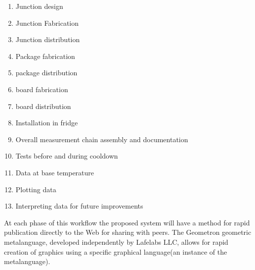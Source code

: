 \documentclass[11pt]{article}
\begin{document}
    \begin{enumerate}

        \item
Junction design
        \item
Junction Fabrication
        \item
Junction distribution
        \item
Package fabrication
        \item
package distribution
        \item
board fabrication
        \item
board distribution
        \item
Installation in fridge
        \item
Overall measurement chain assembly and documentation
        \item
Tests before and during cooldown
        \item
Data at base temperature
        \item
Plotting data
        \item
Interpreting data for future improvements
    \end{enumerate}
    
    


        At each phase of this workflow the proposed system will have a method for rapid publication directly to the Web for sharing with peers.  The Geometron geometric metalanguage, developed independently by Lafelabs LLC, allows for rapid creation of graphics using a specific graphical language(an instance of the metalanguage).   
    
\end{document}

